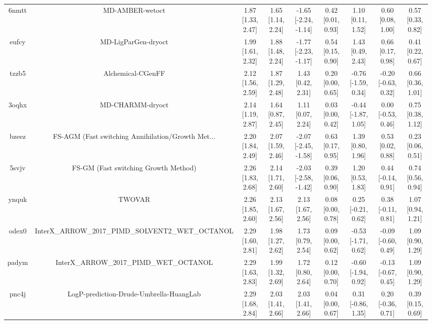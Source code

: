 \documentclass{article}
\begin{document}
\begin{center}
\begin{longtable}{|ccccccccc|}
 6nmtt &                                    MD-AMBER-wetoct &  1.87 [1.33, 2.47] &  1.65 [1.14, 2.24] &  -1.65 [-2.24, -1.14] &  0.42 [0.01, 0.93] &    1.10 [0.11, 1.52] &    0.60 [0.08, 1.00] &     0.57 [0.33, 0.82] \\
 eufcy &                                MD-LigParGen-dryoct &  1.99 [1.61, 2.32] &  1.88 [1.48, 2.24] &  -1.77 [-2.23, -1.17] &  0.54 [0.15, 0.90] &    1.43 [0.49, 2.43] &    0.66 [0.17, 0.98] &     0.41 [0.22, 0.67] \\
 tzzb5 &                                  Alchemical-CGenFF &  2.12 [1.56, 2.59] &  1.87 [1.29, 2.48] &     1.43 [0.42, 2.31] &  0.20 [0.00, 0.65] &  -0.76 [-1.59, 0.34] &  -0.20 [-0.63, 0.32] &     0.66 [0.36, 1.01] \\
 3oqhx &                                   MD-CHARMM-dryoct &  2.14 [1.19, 2.87] &  1.64 [0.87, 2.45] &     1.11 [0.07, 2.24] &  0.03 [0.00, 0.42] &  -0.44 [-1.87, 1.05] &   0.00 [-0.53, 0.46] &     0.75 [0.38, 1.12] \\
 bzeez &  FS-AGM (Fast switching Annihilation/Growth Met... &  2.20 [1.84, 2.49] &  2.07 [1.59, 2.46] &  -2.07 [-2.45, -1.58] &  0.63 [0.17, 0.95] &    1.39 [0.80, 1.96] &    0.53 [0.02, 0.88] &     0.23 [0.06, 0.51] \\
 5svjv &               FS-GM (Fast switching Growth Method) &  2.26 [1.83, 2.68] &  2.14 [1.71, 2.60] &  -2.03 [-2.58, -1.42] &  0.39 [0.06, 0.90] &    1.20 [0.53, 1.83] &   0.44 [-0.14, 0.91] &     0.74 [0.56, 0.94] \\
 ynquk &                                             TWOVAR &  2.26 [1.85, 2.60] &  2.13 [1.67, 2.56] &     2.13 [1.67, 2.56] &  0.08 [0.00, 0.78] &   0.25 [-0.21, 0.62] &   0.38 [-0.11, 0.81] &     1.07 [0.94, 1.21] \\
 odex0 &  InterX\_ARROW\_2017\_PIMD\_SOLVENT2\_WET\_OCTANOL &  2.29 [1.60, 2.81] &  1.98 [1.27, 2.62] &     1.73 [0.79, 2.54] &  0.09 [0.00, 0.62] &  -0.53 [-1.71, 0.62] &  -0.09 [-0.60, 0.49] &     1.09 [0.90, 1.29] \\
 padym &            InterX\_ARROW\_2017\_PIMD\_WET\_OCTANOL &  2.29 [1.63, 2.83] &  1.99 [1.32, 2.69] &     1.72 [0.80, 2.64] &  0.12 [0.00, 0.70] &  -0.60 [-1.94, 0.92] &  -0.13 [-0.67, 0.45] &     1.09 [0.90, 1.29] \\
 pnc4j &            LogP-prediction-Drude-Umbrella-HuangLab &  2.29 [1.68, 2.84] &  2.03 [1.41, 2.66] &     2.03 [1.41, 2.66] &  0.04 [0.00, 0.67] &   0.31 [-0.86, 1.35] &   0.20 [-0.36, 0.71] &     0.39 [0.15, 0.69] \\

\end{longtable}
\end{center}
\end{document}

